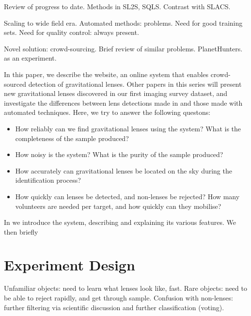 \documentclass[useAMS,usenatbib,a4paper]{mn2e}
\begin{document}
Review of progress to date. Methods in SL2S, SQLS. Contrast with SLACS. 

Scaling to wide field era. Automated methods: problems. Need for good
training sets. Need for quality control: always present.

Novel solution: crowd-sourcing. Brief review of similar problems.
PlanetHunters. \sw as an experiment.

In this paper, we describe the \sw website, an online system that
enables crowd-sourced detection of gravitational lenses. 
Other papers in this series will present new gravitational lenses
discovered in our first imaging survey dataset, and investigate the
differences between lens detections made in \sw and those made with
automated techniques. Here, we try to answer the following questons:
\begin{itemize}

\item How reliably can we find gravitational lenses using the \sw
system? What is the completeness of the sample produced?

\item How noisy is the system? What is the purity of the sample
produced?

\item How accurately can gravitational lenses be located on the sky
during the identification process?

\item How quickly can lenses be detected, and non-lenses be rejected?
How many volunteers are needed per target, and how quickly can they
mobilise?

\end{itemize}

In  we introduce the \sw system, describing and
explaining its various features. We then briefly 




\section{Experiment Design}
\label{sec:design}

Unfamiliar objects: need to learn what lenses look like, fast. Rare
objects: need to be able to reject rapidly, and get through sample.
Confusion with non-lenses: further filtering via scientific discussion
and further classification (voting). 
\end{document}
